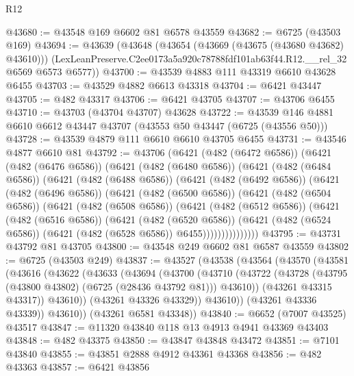 \begin{lexlean}{R12}
\begin{coremodule}
@43680 := @43548 @169 @6602 @81 @6578 @43559
@43682 := @6725 (@43503 @169)
@43694 := @43639
    (@43648
      (@43654 (@43669 (@43675 (@43680 @43682) @43610)))
      (LexLeanPreserve.C2ee0173a5a920c78788fdf101ab63f44.R12.__rel_32 @6569 @6573 @6577))
@43700 := @43539 @4883 @111 @43319 @6610 @43628 @6455
@43703 := @43529 @4882 @6613 @43318
@43704 := @6421 @43447
@43705 := @482 @43317
@43706 := @6421 @43705
@43707 := @43706 @6455
@43710 := @43703 (@43704 @43707) @43628
@43722 := @43539 @146 @4881 @6610 @6612 @43447 @43707 (@43553 @50 @43447 (@6725 (@43556 @50)))
@43728 := @43539 @4879 @111 @6610 @6610 @43705 @6455
@43731 := @43546 @4877 @6610 @81
@43792 := @43706
    (@6421
      (@482 (@6472 @6586))
      (@6421
        (@482 (@6476 @6586))
        (@6421
          (@482 (@6480 @6586))
          (@6421
            (@482 (@6484 @6586))
            (@6421
              (@482 (@6488 @6586))
              (@6421
                (@482 (@6492 @6586))
                (@6421
                  (@482 (@6496 @6586))
                  (@6421
                    (@482 (@6500 @6586))
                    (@6421
                      (@482 (@6504 @6586))
                      (@6421
                        (@482 (@6508 @6586))
                        (@6421
                          (@482 (@6512 @6586))
                          (@6421
                            (@482 (@6516 @6586))
                            (@6421
                              (@482 (@6520 @6586))
                              (@6421
                                (@482 (@6524 @6586))
                                (@6421 (@482 (@6528 @6586)) @6455)))))))))))))))
@43795 := @43731 @43792 @81 @43705
@43800 := @43548 @249 @6602 @81 @6587 @43559
@43802 := @6725 (@43503 @249)
@43837 := @43527
    (@43538
      (@43564
        (@43570
          (@43581
            (@43616
              (@43622
                (@43633
                  (@43694
                    (@43700
                      (@43710
                        (@43722
                          (@43728 (@43795 (@43800 @43802) (@6725 (@28436 @43792 @81))) @43610))
                        (@43261 @43315 @43317))
                      @43610))
                  (@43261 @43326 @43329))
                @43610))
            (@43261 @43336 @43339))
          @43610))
      (@43261 @6581 @43348))
@43840 := @6652 (@7007 @43525) @43517
@43847 := @11320 @43840 @118 @13 @4913 @4941 @43369 @43403
@43848 := @482 @43375
@43850 := @43847 @43848 @43472
@43851 := @7101 @43840
@43855 := @43851 @2888 @4912 @43361 @43368
@43856 := @482 @43363
@43857 := @6421 @43856

\end{coremodule}
\end{lexlean}
